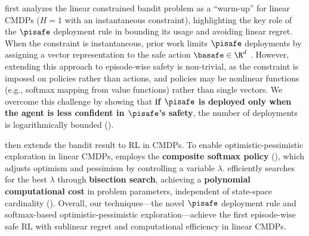  first analyzes the linear constrained bandit problem as a ``warm-up'' for linear CMDPs ($H=1$ with an instantaneous constraint), highlighting the key role of the $\pisafe$ deployment rule in bounding its usage and avoiding linear regret.
When the constraint is instantaneous, prior work limits $\pisafe$ deployments by assigning a vector representation to the safe action $\basafe \in \R^d$ \citep{pacchiano2021stochastic,pacchiano2024contextual,hutchinson2024directional,amani2019linear,amani2021safe}. 
However, extending this approach to episode-wise safety is non-trivial, as the constraint is imposed on policies rather than actions, and policies may be nonlinear functions (e.g., softmax mapping from value functions) rather than single vectors.
We overcome this challenge by showing that \textbf{if $\boldsymbol{\pisafe}$ is deployed only when the agent is less confident in $\boldsymbol{\pisafe}$'s safety}, the number of deployments is logarithmically bounded ().


 then extends the bandit result to RL in CMDPs.
To enable optimistic-pessimistic exploration in linear CMDPs, \MDPalgo employs the \textbf{composite softmax policy} (), which adjusts optimism and pessimism by controlling a variable \(\lambda\).  
\MDPalgo efficiently searches for the best \(\lambda\) through \textbf{bisection search}, achieving a \textbf{polynomial computational cost} in problem parameters, independent of state-space cardinality (). 
Overall, our techniques---the novel $\pisafe$ deployment rule and softmax-based optimistic-pessimistic exploration---achieve the first episode-wise safe RL with sublinear regret and computational efficiency in linear CMDPs.


